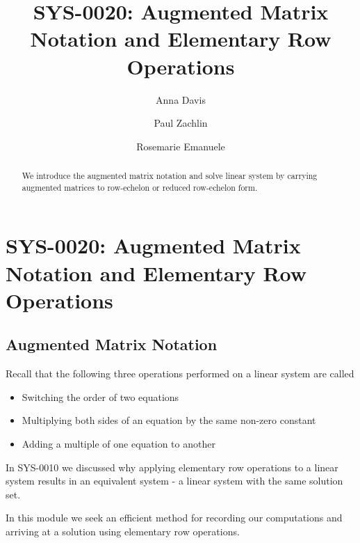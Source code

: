 \documentclass{ximera}
\author{Anna Davis \and Paul Zachlin \and Rosemarie Emanuele} \title{SYS-0020:  Augmented Matrix Notation and Elementary Row Operations} \license{CC-BY-NC-SA}
\begin{document}
\begin{abstract}
  We introduce the augmented matrix notation and solve linear system by carrying augmented matrices to row-echelon or reduced row-echelon form.
\end{abstract}
\maketitle

\section*{SYS-0020:  Augmented Matrix Notation and Elementary Row Operations}

\subsection*{Augmented Matrix Notation}

Recall that the following three operations performed on a linear system are called 
\begin{itemize}
\item Switching the order of two equations
\item Multiplying both sides of an equation by the same non-zero constant
\item Adding a multiple of one equation to another
\end{itemize}


In SYS-0010 we discussed why applying elementary row operations to a linear system results in an equivalent system - a linear system with the same solution set.

In this module we seek an efficient method for recording our computations and arriving at a solution using elementary row operations. 
\end{document}
